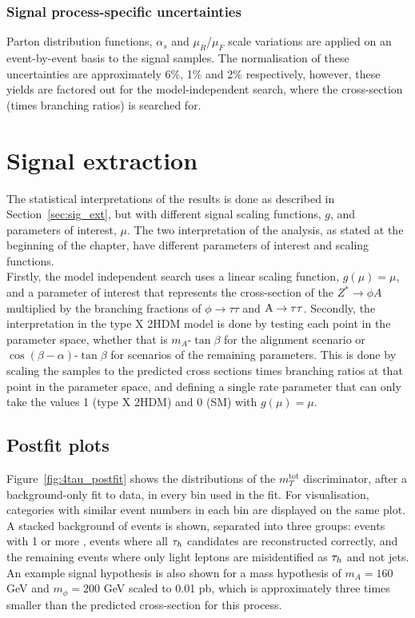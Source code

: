 \subsubsection{Signal process-specific uncertainties}
Parton distribution functions, $\alpha_s$ and $\mu_{R}$/$\mu_{F}$ scale variations are applied on an event-by-event basis to the signal samples.
The normalisation of these uncertainties are approximately 6\%, 1\% and 2\% respectively, however, these yields are factored out for the model-independent search, where the cross-section (times branching ratios) is searched for.

\section{Signal extraction}

The statistical interpretations of the results is done as described in Section~\ref{sec:sig_ext}, but with different signal scaling functions, $g$, and parameters of interest, $\mu$.
The two interpretation of the analysis, as stated at the beginning of the chapter, have different parameters of interest and scaling functions. \\

Firstly, the model independent search uses a linear scaling function, $g(\mu)=\mu$, and a parameter of interest that represents the cross-section of the $Z^{*}\rightarrow \phi A$ multiplied by the branching fractions of $\phi\rightarrow\tau\tau$ and ${\text{A}}\rightarrow\tau\tau$.
Secondly, the interpretation in the type X \ac{2HDM} model is done by testing each point in the parameter space, whether that is $m_{A}$-$\tan\beta$ for the alignment scenario or $\cos(\beta-\alpha)$-$\tan\beta$ for scenarios of the remaining parameters. 
This is done by scaling the samples to the predicted cross sections times branching ratios at that point in the parameter space, and defining a single rate parameter that can only take the values 1 (type X \ac{2HDM}) and 0 (\ac{SM}) with $g(\mu)=\mu$.

\subsection{Postfit plots}

Figure~\ref{fig:4tau_postfit} shows the distributions of the $m_{T}^{\text{tot}}$ discriminator, after a background-only fit to data, in every bin used in the fit.
For visualisation, categories with similar event numbers in each bin are displayed on the same plot.
A stacked background of events is shown, separated into three groups: events with 1 or more \jtth, events where all $\tau_{h}$ candidates are reconstructed correctly, and the remaining events where only light leptons are misidentified as $\tau_{h}$ and not jets.
An example signal hypothesis is also shown for a mass hypothesis of $m_A = 160$ GeV and $m_{\phi} = 200$ GeV scaled to 0.01 pb, which is approximately three times smaller than the predicted cross-section for this process. \\

